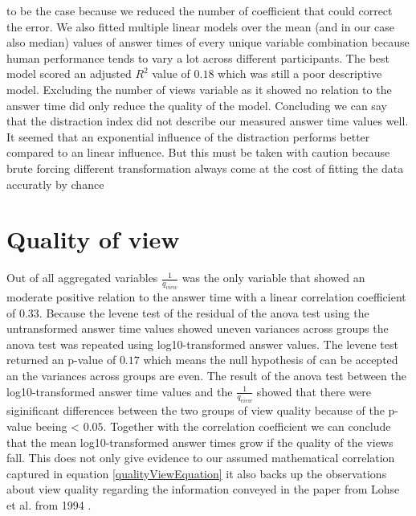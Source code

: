 to be the case because we reduced the number of coefficient that could correct the error.
We also fitted multiple linear models over the mean (and in our case also median) values of answer times of every unique variable combination because human performance
tends to vary a lot across different participants. The best model scored an adjusted $R^2$ value of $0.18$ which was still a poor descriptive model. Excluding
the number of views variable as it showed no relation to the answer time did only reduce the quality of the model. Concluding we can say that the distraction index
did not describe our measured answer time values well. It seemed that an exponential influence of the distraction performs better compared to an linear influence.
But this must be taken with caution because brute forcing different transformation always come at the cost of fitting the data accuratly by chance 

\section{Quality of view}
Out of all aggregated variables $\frac{1}{q_{view}}$ was the only variable that showed an moderate positive relation to the answer time with a linear correlation coefficient of $0.33$.
Because the levene test of the residual of the anova test using the untransformed answer time values showed uneven variances across groups the anova test was repeated
using log10-transformed answer values. The levene test returned an p-value of $0.17$ which means the null hypothesis of can be accepted an the variances across groups are even.
The result of the anova test between the log10-transformed answer time values and the $\frac{1}{q_{view}}$ showed that there were siginificant differences between
the two groups of view quality because of the p-value beeing < $0.05$. Together with the correlation coefficient we can conclude that the mean log10-transformed answer times
grow if the quality of the views fall. This does not only give evidence to our assumed mathematical correlation captured in equation \ref{qualityViewEquation} it also backs up
the observations about view quality regarding the information conveyed in the paper from Lohse et al. from 1994 \citep{Lohse.1994}.

